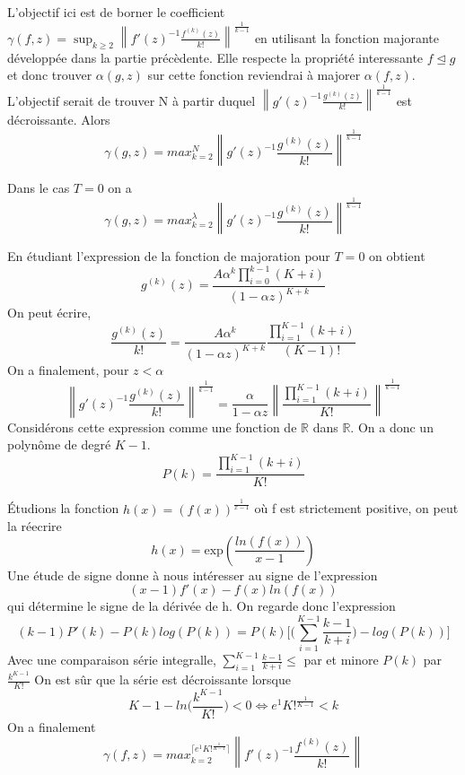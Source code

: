 \documentclass[a4paper,10.5pt]{article}
\begin{document}
	\noindent L'objectif ici est de borner le coefficient $\gamma(f,z)=\sup_{k \geq 2} \left\|f'(z)^{-1}\frac{f^{(k)}(z)}{k!}\right\|^{\frac{1}{k-1}}$ en utilisant la fonction majorante développée dans la partie précèdente. Elle respecte la propriété interessante $f\unlhd g$ et donc trouver $\alpha(g,z)$ sur cette fonction reviendrai à majorer $\alpha(f,z)$. L'objectif serait de trouver N à partir duquel $\left\|g'(z)^{-1}\frac{g^{(k)}(z)}{k!}\right\|^{\frac{1}{k-1}}$ est décroissante. Alors 
	\[\gamma(g,z)=max_{k=2}^{N}\left\|g'(z)^{-1}\frac{g^{(k)}(z)}{k!}\right\|^{\frac{1}{k-1}}\] 
	
	\begin{proposition} Dans le cas $T=0$ on a \[\gamma(g,z)=max_{k=2}^{\lambda}\left\|g'(z)^{-1}\frac{g^{(k)}(z)}{k!}\right\|^{\frac{1}{k-1}}\]
	\end{proposition}

	\begin{demonstration}
	\noindent En étudiant l'expression de la fonction de majoration pour $T=0$ on obtient
	\[g^{(k)}(z)=\frac{A\alpha^{k}\prod_{i=0}^{k-1}(K+i)}{(1-\alpha z)^{K+k}}\]
	On peut écrire,
	\[\frac{g^{(k)}(z)}{k!}=\frac{A\alpha^{k}}{(1-\alpha z)^{K+k}} \frac{\prod_{i=1}^{K-1}(k+i)}{(K-1)!} \]
	On a finalement, pour $z < \alpha$ 
	\[\left\|g'(z)^{-1}\frac{g^{(k)}(z)}{k!}\right\|^{\frac{1}{k-1}}= \frac{\alpha}{1-\alpha z} \left\|\frac{\prod_{i=1}^{K-1}(k+i)}{K!}\right\|^{\frac{1}{k-1}} \tag{*}\]
	Considérons cette expression comme une fonction de $\mathbb{R}$ dans $\mathbb{R}$. On a donc un polynôme de degré $K-1$.
	\[P(k)=\frac{\prod_{i=1}^{K-1}(k+i)}{K!}\]
	
	
	\noindent Étudions la fonction $h(x)=(f(x))^{\frac{1}{x-1}}$ où f est strictement positive, on peut la réecrire
	\[h(x)=\text{exp}(\frac{ln(f(x))}{x-1}) \]
	Une étude de signe donne à nous intéresser au signe de l'expression
	\[(x-1)f'(x)-f(x)ln(f(x)) \tag{1}\] 
	qui détermine le signe de la dérivée de h. On regarde donc l'expression 
	\[(k-1)P'(k)-P(k)log(P(k))=P(k)\Big[\big(\sum_{i=1}^{K-1}\frac{k-1}{k+i}\big)-log(P(k))\Big]\]
	Avec une comparaison série integralle, $\sum_{i=1}^{K-1}\frac{k-1}{k+i} \leq $ par et minore $P(k)$ par $\frac{k^{K-1}}{K!}$ On est sûr que la série est décroissante lorsque 
	\[K-1-ln\big(\frac{k^{K-1}}{K!}\big)<0 \Longleftrightarrow e^{1}K!^{\frac{1}{K-1}}< k\]
	On a finalement 
	\[\gamma(f,z)=max_{k=2}^{\lceil e^{1}K!^{\frac{1}{K-1}} \rceil}\left\|f'(z)^{-1}\frac{f^{(k)}(z)}{k!}\right\| \]
	\end{demonstration}
\end{document}
